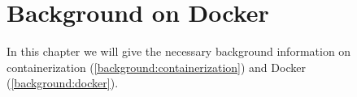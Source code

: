\chapter{Background on Docker}\label{chapter:background}
In this chapter we will give the necessary background information on containerization (\autoref{background:containerization}) and Docker (\autoref{background:docker}).


